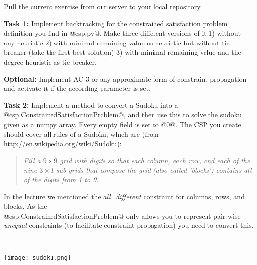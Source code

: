 

\renewcommand{\course}{Artificial Intelligence}
\renewcommand{\coursepicture}{course_ai}
\renewcommand{\coursedate}{Winter 2019}
\renewcommand{\exnum}{5}

\exercises
{}
\exercisestitle



Pull the current exercise from our server to your local repository.

\textbf{Task 1:} Implement backtracking for the constrained satisfaction problem
definition you find in @csp.py@. Make three different versions of it 1) without
any heuristic 2) with minimal remaining value as heuristic but without
tie-breaker (take the first best solution) 3) with minimal remaining value and
the degree heuristic as tie-breaker.

\textbf{Optional:} Implement AC-3 or any approximate form of
constraint propagation and activate it if the according
parameter is set.

\textbf{Task 2:} Implement a method to convert a Sudoku into a
@csp.ConstrainedSatisfactionProblem@, and then use this to solve the sudoku given as a numpy array. Every empty field is set to
@0@. The CSP you create should cover all rules of a Sudoku, which are
(from
\url{http://en.wikipedia.org/wiki/Sudoku}): 
\begin{quote}
\emph{Fill a $9 \times 9$ grid with digits so that each column, each row,
and each of the nine $3 \times 3$ sub-grids that compose the grid
(also called 'blocks') contains all of the digits from 1 to 9.}
\end{quote}
In the lecture we mentioned the \emph{all\_different} constraint for
columns, rows, and blocks. As the\\ @csp.ConstrainedSatisfactionProblem@
only allows you to represent pair-wise \emph{unequal} constraints (to
facilitate constraint propagation) you need to convert this.

~

\begin{center}
\texttt{[image: sudoku.png]}
\end{center}


